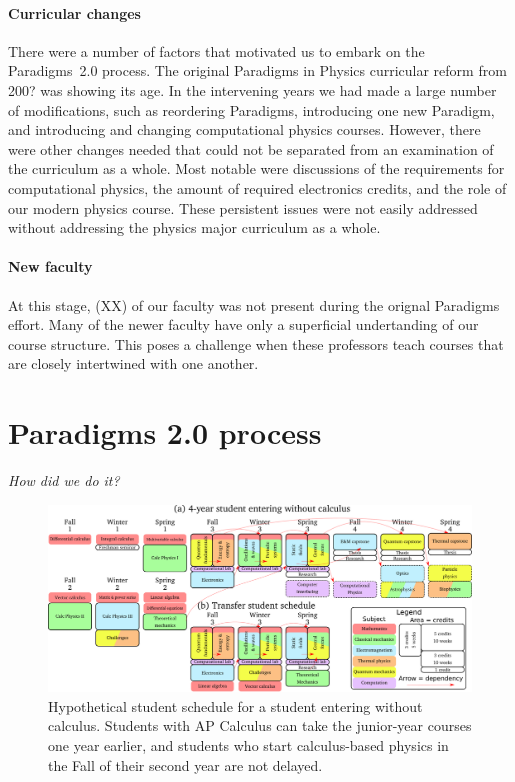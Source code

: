 \documentclass[english,aps,pra,reprint,noshowpacs,superscriptaddress]{revtex4-1}
\begin{document}
\paragraph{Curricular changes}
There were a number of factors that motivated us to embark on the
Paradigms~2.0 process.  The original Paradigms in Physics curricular
reform from 200? was showing its age.  In the intervening years we had
made a large number of modifications, such as reordering Paradigms,
introducing one new Paradigm, and introducing and changing
computational physics courses.  However, there were other changes
needed that could not be separated from an examination of the
curriculum as a whole.  Most notable were discussions of the
requirements for computational physics, the amount of required
electronics credits, and the role of our modern physics course.  These
persistent issues were not easily addressed without addressing the
physics major curriculum as a whole.

\paragraph{New faculty}
At this stage, (XX) of our faculty was not present during the orignal
Paradigms effort.  Many of the newer faculty have only a superficial
undertanding of our course structure.  This poses a challenge when
these professors teach courses that are closely intertwined with one
another.

\section{Paradigms 2.0 process}
\emph{How did we do it?}

\newcommand\mathcourse[2]{\emph{#1}}
\newcommand\noted[2]{\textbf{#1} (#2)}
\newcommand\paradigm[1]{{\sc #1} (3)}
\newcommand\capstone[1]{#1 (3)}
\newcommand\onecredit[1]{#1 (1)}
\newcommand\threecredit[1]{#1 (3)}
\newcommand\fourcredit[1]{#1 (4)}

\begin{figure}
\includegraphics[width=\textwidth]{schedule}
\caption{Hypothetical student schedule for a student entering without
  calculus.  Students with AP Calculus can take the junior-year
  courses one year earlier, and students who start calculus-based
  physics in the Fall of their second year are not
  delayed.\label{schedule}}
\end{figure}
\end{document}
